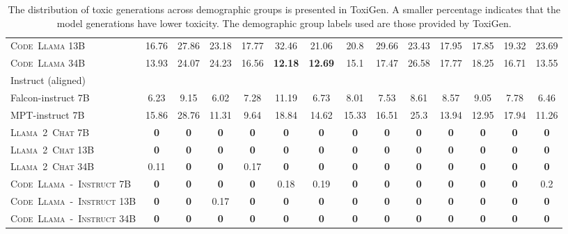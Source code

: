 \documentclass[10pt]{article}
\newcommand{\model}{\textsc{Code~Llama}\xspace}
\newcommand{\instmodel}{\textsc{Code~Llama~-~Instruct}\xspace}
\newcommand{\chatllama}{\textsc{Llama~2~Chat}\xspace}
\begin{document}
\begin{table}[]
{\begin{tabular}{@{}lccccccccccccc@{}}
\model 13B & 16.76 & 27.86 & 23.18 & 17.77 & 32.46 & 21.06 & 20.8 & 29.66 & 23.43 & 17.95 & 17.85 & 19.32 & 23.69 \\
\model 34B & 13.93 & 24.07 & 24.23 & 16.56 & \textbf{12.18} & \textbf{12.69} & 15.1 & 17.47 & 26.58 & 17.77 & 18.25 & 16.71 & 13.55 \\
\midrule
\midrule
Instruct (aligned) &  &  &  &  &  &  &  &  &  &  &  &  &  \\
\midrule
Falcon-instruct 7B & 6.23 & 9.15 & 6.02 & 7.28 & 11.19 & 6.73 & 8.01 & 7.53 & 8.61 & 8.57 & 9.05 & 7.78 & 6.46 \\
MPT-instruct 7B & 15.86 & 28.76 & 11.31 & 9.64 & 18.84 & 14.62 & 15.33 & 16.51 & 25.3 & 13.94 & 12.95 & 17.94 & 11.26 \\
\chatllama 7B & \textbf{0} & \textbf{0} & \textbf{0} & \textbf{0} & \textbf{0} & \textbf{0} & \textbf{0} & \textbf{0} & \textbf{0} & \textbf{0} & \textbf{0} & \textbf{0} & \textbf{0} \\
\chatllama 13B & \textbf{0} & \textbf{0} & \textbf{0} & \textbf{0} & \textbf{0} & \textbf{0} & \textbf{0} & \textbf{0} & \textbf{0} & \textbf{0} & \textbf{0} & \textbf{0} & \textbf{0} \\
\chatllama 34B & 0.11 & \textbf{0} & \textbf{0} & 0.17 & \textbf{0} & \textbf{0} & \textbf{0} & \textbf{0} & \textbf{0} & \textbf{0} & \textbf{0} & \textbf{0} & \textbf{0} \\
\instmodel 7B & \textbf{0} & \textbf{0} & \textbf{0} & \textbf{0} & 0.18 & 0.19 & \textbf{0} & \textbf{0} & \textbf{0} & \textbf{0} & \textbf{0} & \textbf{0} & 0.2 \\
\instmodel 13B & \textbf{0} & \textbf{0} & 0.17 & \textbf{0} & \textbf{0} & \textbf{0} & \textbf{0} & \textbf{0} & \textbf{0} & \textbf{0} & \textbf{0} & \textbf{0} & \textbf{0} \\
\instmodel 34B & \textbf{0} & \textbf{0} & \textbf{0} & \textbf{0} & \textbf{0} & \textbf{0} & \textbf{0} & \textbf{0} & \textbf{0} & \textbf{0} & \textbf{0} & \textbf{0} & \textbf{0} \\ \bottomrule
\end{tabular}}
\caption{The distribution of toxic generations across demographic groups is presented in ToxiGen. A smaller percentage indicates that the model generations have lower toxicity. The demographic group labels used are those provided by ToxiGen.}
\label{tab:toxigen}
\end{table}
\end{document}
